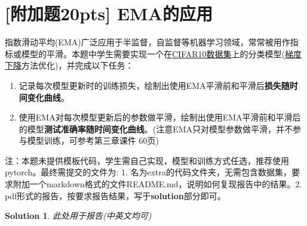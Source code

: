 \documentclass[a4paper,UTF8]{article}
\numberwithin{equation}{section}
\newtheorem*{mySol}{Solution}
\begin{document}
\newpage
\section{[附加题20pts] EMA的应用}
指数滑动平均(EMA)广泛应用于半监督，自监督等机器学习领域，常常被用作指标或模型的平滑。本题中学生需要实现一个在\href{https://www.cs.toronto.edu/~kriz/cifar.html}{CIFAR10数据集}上的分类模型(\href{https://en.wikipedia.org/wiki/Gradient_descent}{梯度下降}方法优化)，并完成以下任务：
\begin{enumerate}[ {(}1{)}]
	\item 记录每次模型更新时的训练损失，绘制出使用EMA平滑前和平滑后\textbf{损失随时间变化曲线}。
	\item 使用EMA对每次模型更新后的参数做平滑，绘制出使用EMA平滑前和平滑后的模型\textbf{测试准确率随时间变化曲线}。(注意EMA只对模型参数做平滑，并不参与模型训练，可参考第三章课件 60页)
\end{enumerate}
注：本题未提供模板代码，学生需自己实现，模型和训练方式任选，推荐使用pytorch。最终需提交的文件为: 1. 名为extra的代码文件夹，无需包含数据集，要求附加一个markdown格式的文件README.md，说明如何复现报告中的结果。2. pdf形式的报告，按要求报告结果，写于\textbf{solution}部分即可。
\begin{mySol}
	此处用于报告(中英文均可)
	~\\
	~\\
	~\\
	~\\
\end{mySol}
\end{document}
